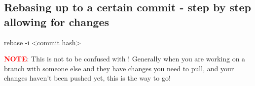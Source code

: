 \subsection{Rebasing up to a certain commit - step by step allowing for changes}
\begin{gitBashBox}
rebase -i <commit hash>    
\end{gitBashBox}

\begin{tcolorbox}[infoBox]
        \textcolor{red}{\textbf{NOTE}}: This is not to be confused with ! Generally when you are working on a branch with someone else and they
have changes you need to pull, and your changes haven't been pushed yet, this is the way to go!
\end{tcolorbox}


